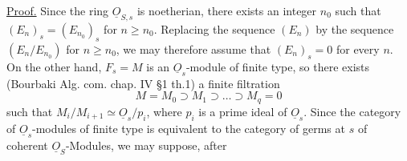 \uline{Proof.} Since the ring $\underline{O}_{S,s}$ is noetherian, there exists an integer $n_0$ such that $(E_n)_s=(E_{n_0})_s$ for $n\geq n_0$. Replacing the sequence $(E_n)$ by the sequence $(E_n/E_{n_0})$ for $n\geq n_0$, we may therefore assume that $(E_n)_s=0$ for every $n$. On the other hand, $F_s=M$ is an $\underline{O}_s$-module of finite type, so there exists (Bourbaki Alg. com. chap. IV \S1 th.1) a finite filtration
\[
 M=M_0\supset M_1\supset\ldots\supset M_q=0
\]
such that $M_i/M_{i+1}\simeq \underline{O}_s/p_i$, where $p_i$ is a prime ideal of $\underline{O}_s$. Since the category of $\underline{O}_s$-modules of finite type is equivalent to the category of germs at $s$ of coherent $\underline{O}_S$-Modules, we may suppose, after
